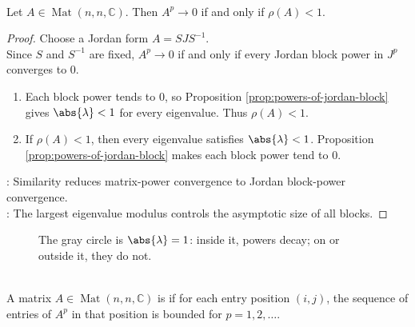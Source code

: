 \begin{theorem} \label{thm:matrix-powers-converge-to-zero-spectral-radius} \\
Let $A\in\operatorname{Mat}(n,n,\mathbb{C})$. Then $A^p\to0$ if and only if $\rho(A)<1$.
\begin{proof}
Choose a Jordan form $A=SJS^{-1}$.\\
Since $S$ and $S^{-1}$ are fixed, $A^p\to0$ if and only if every Jordan block power in $J^p$ converges to $0$.
\begin{enumerate}[label=\roman*.]
\setlength{\itemsep}{0pt}
\item[$(\Rightarrow)$] Each block power tends to $0$, so Proposition \ref{prop:powers-of-jordan-block} gives $\abs{\lambda}<1$ for every eigenvalue. Thus $\rho(A)<1$.
\item[$(\Leftarrow)$] If $\rho(A)<1$, then every eigenvalue satisfies $\abs{\lambda}<1$. Proposition \ref{prop:powers-of-jordan-block} makes each block power tend to $0$.
\end{enumerate}
: Similarity reduces matrix-power convergence to Jordan block-power convergence.\\
: The largest eigenvalue modulus controls the asymptotic size of all blocks.
\end{proof}
\end{theorem}

\begin{figure}[H]
  \centering
  
  \caption{The gray circle is $\abs{\lambda}=1$: inside it, powers decay; on or outside it, they do not.}
  \label{fig:jordan-spectral-radius-convergence}
\end{figure}

\begin{definition} \label{def:power-bounded-matrix} \\
A matrix $A\in\operatorname{Mat}(n,n,\mathbb{C})$ is  if for each entry position $(i,j)$, the sequence of entries of $A^p$ in that position is bounded for $p=1,2,\ldots$.
\end{definition}

